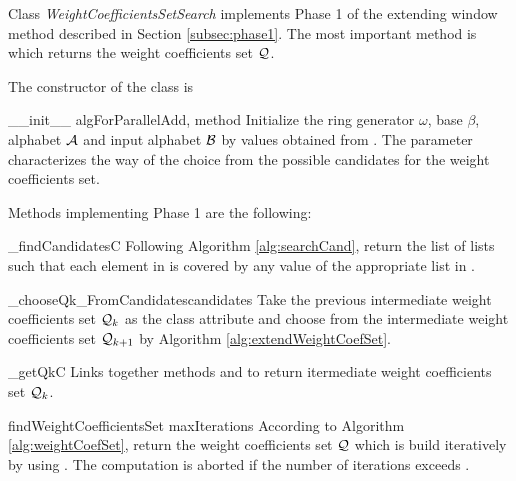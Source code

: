 Class \emph{WeightCoefficientsSetSearch} implements Phase 1 of the extending window method described in Section \ref{subsec:phase1}. The most important method is   which returns the weight coefficients set $\mathcal{Q}$.

The constructor of the class is 

\begin{method}{\_\_init\_\_}{ algForParallelAdd, method}
Initialize the ring generator $\omega$, base $\beta$, alphabet $\mathcal{A}$ and input alphabet $\mathcal{B}$ by values obtained from . The parameter  characterizes the way of the choice from the possible candidates for the weight coefficients set.  
\end{method}

Methods implementing Phase 1 are the following:

\begin{method}{\_findCandidates}{C}
Following Algorithm \ref{alg:searchCand}, return the list of lists  such that each element in  is covered by any value of the appropriate list in .  
\end{method}


\begin{method}{\_chooseQk\_FromCandidates}{candidates}
Take the previous intermediate weight coefficients set $\mathcal{Q}_{k}$ as the class attribute and choose from  the intermediate weight coefficients set $\mathcal{Q}_{k+1}$ by Algorithm \ref{alg:extendWeightCoefSet}.
\end{method}


\begin{method}{\_getQk}{C}
Links together methods  and  to return itermediate weight coefficients set $\mathcal{Q}_k$.
\end{method}


\begin{method}{findWeightCoefficientsSet}{ maxIterations}
According to Algorithm \ref{alg:weightCoefSet}, return the weight coefficients set $\mathcal{Q}$ which is build iteratively by using . The computation is aborted if the number of iterations exceeds . 
\end{method}

